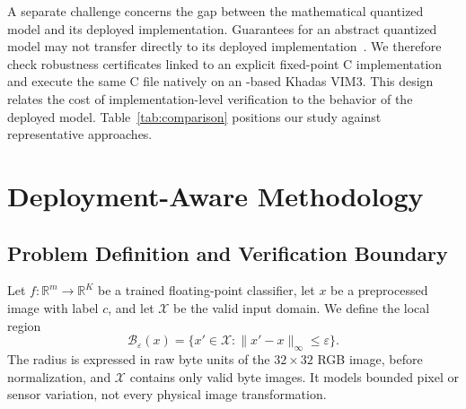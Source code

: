 A separate challenge concerns the gap between the mathematical quantized model and its deployed implementation. Guarantees for an abstract quantized model may not transfer directly to its deployed implementation~\cite{Cordeiro2025NNPL}. We therefore check robustness certificates linked to an explicit fixed-point C implementation and execute the same C file natively on an \AAOS{}-based Khadas VIM3. This design relates the cost of implementation-level verification to the behavior of the deployed model. Table~\ref{tab:comparison} positions our study against representative approaches.

\begin{table}[h]
\centering
\caption{Positioning against representative approaches. C-level includes C abstractions. [AUTHOR CHECK: confirm the remaining feature classifications.]
}
\label{tab:comparison}
\scriptsize
{}%
\end{table}

\section{Deployment-Aware Methodology}
\label{sec:methodology}

\subsection{Problem Definition and Verification Boundary}
\label{sec:problem}

Let $f:\mathbb{R}^{m}\rightarrow\mathbb{R}^{K}$ be a trained floating-point classifier, let $x$ be a preprocessed image with label $c$, and let $\mathcal{X}$ be the valid input domain. We define the local region
\begin{equation}
\mathcal{B}_{\varepsilon}(x)=\{x'\in\mathcal{X}:\|x'-x\|_{\infty}\leq\varepsilon\}.
\label{eq:ball}
\end{equation}
The radius is expressed in raw byte units of the $32\times32$ RGB image, before normalization, and $\mathcal{X}$ contains only valid byte images. It models bounded pixel or sensor variation, not every physical image transformation.

